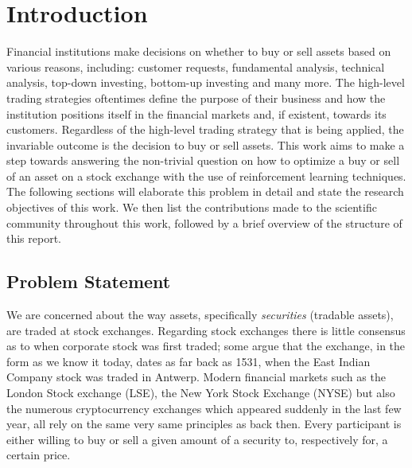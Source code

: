 \chapter{Introduction}

Financial institutions make decisions on whether to buy or sell assets based on various reasons, including: customer requests, fundamental analysis\cite{fundamental-analysis}, technical analysis\cite{technical-analysis}, top-down investing\cite{td-investing}, bottom-up investing\cite{bu-investing} and many more. 
The high-level trading strategies oftentimes define the purpose of their business and how the institution positions itself in the financial markets and, if existent, towards its customers. 
Regardless of the high-level trading strategy that is being applied, the invariable outcome is the decision to buy or sell assets.
This work aims to make a step towards answering the non-trivial question on how to optimize a buy or sell of an asset on a stock exchange with the use of reinforcement learning techniques.
The following sections will elaborate this problem in detail and state the research objectives of this work. 
We then list the contributions made to the scientific community throughout this work, followed by a brief overview of the structure of this report.

\section{Problem Statement}
\label{sec:problem-statement}

We are concerned about the way assets, specifically \textit{securities} (tradable assets), are traded at stock exchanges.
Regarding stock exchanges there is little consensus as to when corporate stock was first traded; some argue that the exchange, in the form as we know it today, dates as far back as 1531, when the East Indian Company stock was traded in Antwerp\cite{stock-exchange}.
Modern financial markets such as the London Stock exchange (LSE), the New York Stock Exchange (NYSE) but also the numerous cryptocurrency exchanges which appeared suddenly in the last few year, all rely on the same very same principles as back then.
Every participant is either willing to buy or sell a given amount of a security to, respectively for, a certain price.

